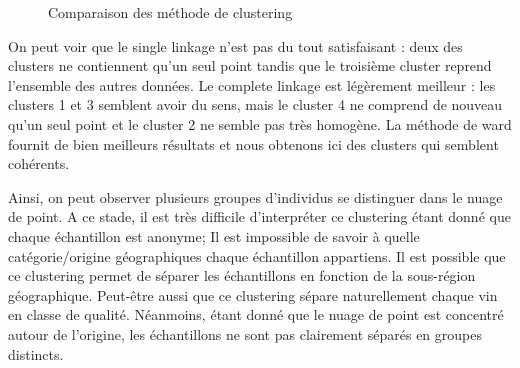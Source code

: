 \documentclass[11pt,a4paper]{article}
\begin{document}
\begin{figure}[ht]
	\centering
	
	\caption{Comparaison des méthode de clustering}

\end{figure}


On peut voir que le single linkage n'est pas du tout satisfaisant : deux des clusters ne contiennent qu'un seul point tandis que le troisième cluster reprend l'ensemble des autres données. Le complete linkage est légèrement meilleur : les clusters 1 et 3 semblent avoir du sens, mais le cluster 4 ne comprend de nouveau qu'un seul point et le cluster 2 ne semble pas très homogène. La méthode de ward fournit de bien meilleurs résultats et nous obtenons ici des clusters qui semblent cohérents.

Ainsi, on peut observer plusieurs groupes d'individus se distinguer dans le nuage de point. A ce stade, il est très difficile d'interpréter ce clustering étant donné que chaque échantillon est anonyme; Il est impossible de savoir à quelle catégorie/origine géographiques chaque échantillon appartiens. Il est possible que ce clustering permet de séparer les échantillons en fonction de la sous-région géographique. Peut-être aussi que ce clustering sépare naturellement chaque vin en classe de qualité. Néanmoins, étant donné que le nuage de point est concentré autour de l'origine, les échantillons ne sont pas clairement séparés en groupes distincts.
\end{document}
